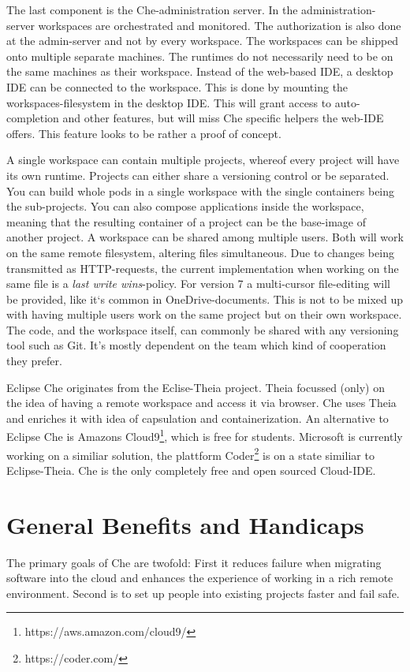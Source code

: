 \documentclass[english,utf8]{lni}
\begin{document}
The last component is the Che-administration server. 
In the administration-server workspaces are orchestrated and monitored. 
The authorization is also done at the admin-server and not by every workspace.
The workspaces can be shipped onto multiple separate machines.
The runtimes do not necessarily need to be on the same machines as their workspace. 
Instead of the web-based IDE, a desktop IDE can be connected to the workspace. 
This is done by mounting the workspaces-filesystem in the desktop  IDE. 
This  will grant access to auto-completion and other features, but will miss Che specific helpers the web-IDE offers.
This feature looks to be rather a proof of concept.

A single workspace can contain multiple projects, whereof every project will have its own runtime. 
Projects can either share a versioning control or be separated. 
You can build whole pods in a single workspace with the single containers being the sub-projects. 
You can also compose applications inside the workspace, meaning that the resulting container of a project can be the base-image of another project. 
A workspace can be shared among multiple users. 
Both will work on the same remote filesystem, altering files simultaneous. 
Due to changes being transmitted as HTTP-requests, the current implementation when working on the same file is a \textit{last write wins}-policy. 
For version 7 a multi-cursor file-editing will be provided, like it`s common in OneDrive-documents. 
This is not to be mixed up with having multiple users work on the same project but on their own workspace. 
The code, and the workspace itself, can commonly be shared with any versioning tool such as Git.
It's mostly dependent on the team which kind of cooperation they prefer. 

Eclipse Che originates from the Eclise-Theia project. 
Theia focussed (only) on the idea of having a remote workspace and access it via browser. 
Che uses Theia and enriches it with idea of capsulation and containerization. 
An alternative to Eclipse Che is Amazons Cloud9\footnote{https://aws.amazon.com/cloud9/}, which is free for students. 
Microsoft is currently working on a similiar solution, the plattform Coder\footnote{https://coder.com/} is on a state similiar to Eclipse-Theia. 
Che is the only completely free and open sourced Cloud-IDE. 

\section{General Benefits and Handicaps}
\label{sec:Eval}
The primary goals of Che are twofold: 
First it reduces failure when migrating software into the cloud and enhances the experience of working in a rich remote environment.
Second is to set up people into existing projects faster and fail safe.
\end{document}
